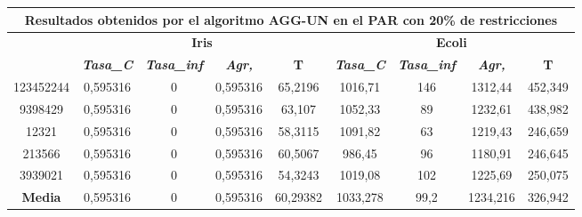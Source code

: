 \documentclass[12pt, spanish]{article}
\begin{document}
\begin{table}[H]
\footnotesize

\begin{tabular}{|c|c|c|c|c|c|c|c|c|}
\hline
\multicolumn{9}{|c|}{\textbf{Resultados obtenidos por el algoritmo AGG-UN en el PAR con 20\% de restricciones}}                                                                                                   \\ \hline
\multirow{2}{*}{} & \multicolumn{4}{c|}{\textbf{Iris}}                                                            & \multicolumn{4}{c|}{\textbf{Ecoli}}                                                           \\ \cline{2-9} 
                  & \textit{\textbf{Tasa\_C}} & \textit{\textbf{Tasa\_inf}} & \textit{\textbf{Agr,}} & \textbf{T} & \textit{\textbf{Tasa\_C}} & \textit{\textbf{Tasa\_inf}} & \textit{\textbf{Agr,}} & \textbf{T} \\ \hline
123452244         & 0,595316                  & 0                           & 0,595316               & 65,2196    & 1016,71                   & 146                         & 1312,44                & 452,349    \\ \hline
9398429           & 0,595316                  & 0                           & 0,595316               & 63,107     & 1052,33                   & 89                          & 1232,61                & 438,982    \\ \hline
12321             & 0,595316                  & 0                           & 0,595316               & 58,3115    & 1091,82                   & 63                          & 1219,43                & 246,659    \\ \hline
213566            & 0,595316                  & 0                           & 0,595316               & 60,5067    & 986,45                    & 96                          & 1180,91                & 246,645    \\ \hline
3939021           & 0,595316                  & 0                           & 0,595316               & 54,3243    & 1019,08                   & 102                         & 1225,69                & 250,075    \\ \hline
\textbf{Media}    & 0,595316                  & 0                           & 0,595316               & 60,29382   & 1033,278                  & 99,2                        & 1234,216               & 326,942    \\ \hline
\end{tabular}
\end{table}
\end{document}
